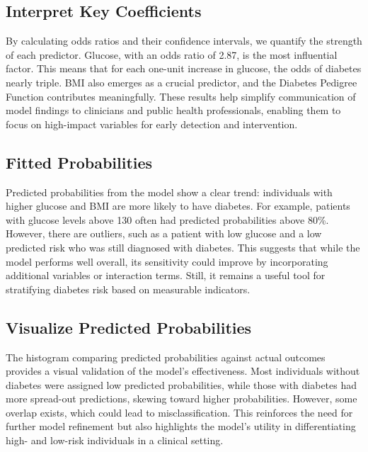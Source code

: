 \documentclass[
]{article}
\begin{document}
\subsection{Interpret Key
Coefficients}\label{interpret-key-coefficients-1}

By calculating odds ratios and their confidence intervals, we quantify
the strength of each predictor. Glucose, with an odds ratio of 2.87, is
the most influential factor. This means that for each one-unit increase
in glucose, the odds of diabetes nearly triple. BMI also emerges as a
crucial predictor, and the Diabetes Pedigree Function contributes
meaningfully. These results help simplify communication of model
findings to clinicians and public health professionals, enabling them to
focus on high-impact variables for early detection and intervention.

\subsection{Fitted Probabilities}\label{fitted-probabilities}

Predicted probabilities from the model show a clear trend: individuals
with higher glucose and BMI are more likely to have diabetes. For
example, patients with glucose levels above 130 often had predicted
probabilities above 80\%. However, there are outliers, such as a patient
with low glucose and a low predicted risk who was still diagnosed with
diabetes. This suggests that while the model performs well overall, its
sensitivity could improve by incorporating additional variables or
interaction terms. Still, it remains a useful tool for stratifying
diabetes risk based on measurable indicators.

\subsection{Visualize Predicted
Probabilities}\label{visualize-predicted-probabilities}

The histogram comparing predicted probabilities against actual outcomes
provides a visual validation of the model's effectiveness. Most
individuals without diabetes were assigned low predicted probabilities,
while those with diabetes had more spread-out predictions, skewing
toward higher probabilities. However, some overlap exists, which could
lead to misclassification. This reinforces the need for further model
refinement but also highlights the model's utility in differentiating
high- and low-risk individuals in a clinical setting.
\end{document}
